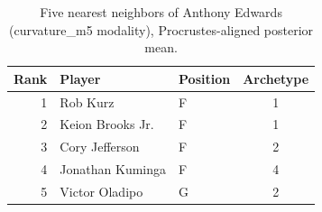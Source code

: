 \begin{table}[htbp]
  \centering\small
  \begin{tabular}{rllc}
    \toprule
    Rank & Player & Position & Archetype \\
    \midrule
    1 & Rob Kurz & F & 1 \\
    2 & Keion Brooks Jr. & F & 1 \\
    3 & Cory Jefferson & F & 2 \\
    4 & Jonathan Kuminga & F & 4 \\
    5 & Victor Oladipo & G & 2 \\
    \bottomrule
  \end{tabular}
  \caption{Five nearest neighbors of Anthony Edwards (curvature_m5 modality), Procrustes-aligned posterior mean.}
  \label{tab:Anthony_Edwards_neighbors_curvature_m5}
\end{table}

